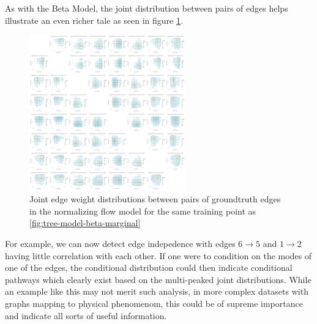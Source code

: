 As with the Beta Model, the joint distribution between pairs of edges helps illustrate an even richer tale as seen in figure \ref{fig:tree-model-dnfg-joint}.
\begin{figure}[htb]
	\centering
	\includegraphics[width=0.6\textwidth]{images/tree-model-dnfg-joint.pdf}
	\caption{Joint edge weight distributions between pairs of groundtruth edges in the normalizing flow model for the same training point as \ref{fig:tree-model-beta-marginal}}
	\label{fig:tree-model-dnfg-joint}
\end{figure}

For example, we can now detect edge indepedence with edges $6 \rightarrow 5$ and $1 \rightarrow 2$ having little correlation with each other. If one were to condition on the modes of one of the edges, the conditional distribution could then indicate conditional pathways which clearly exist based on the multi-peaked joint distributions. While an example like this may not merit such analysis, in more complex datasets with graphs mapping to physical phenomenom, this could be of supreme importance and indicate all sorts of useful information.

\newpage

